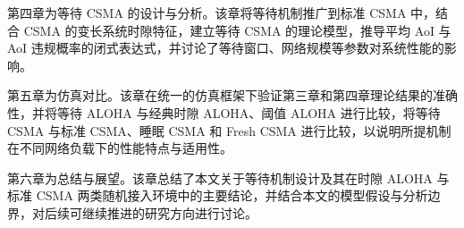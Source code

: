 第四章为等待 CSMA 的设计与分析。该章将等待机制推广到标准 CSMA 中，结合 CSMA 的变长系统时隙特征，建立等待 CSMA 的理论模型，推导平均 AoI 与 AoI 违规概率的闭式表达式，并讨论了等待窗口、网络规模等参数对系统性能的影响。

第五章为仿真对比。该章在统一的仿真框架下验证第三章和第四章理论结果的准确性，并将等待 ALOHA 与经典时隙 ALOHA、阈值 ALOHA 进行比较，将等待 CSMA 与标准 CSMA、睡眠 CSMA 和 Fresh CSMA 进行比较，以说明所提机制在不同网络负载下的性能特点与适用性。

第六章为总结与展望。该章总结了本文关于等待机制设计及其在时隙 ALOHA 与标准 CSMA 两类随机接入环境中的主要结论，并结合本文的模型假设与分析边界，对后续可继续推进的研究方向进行讨论。
